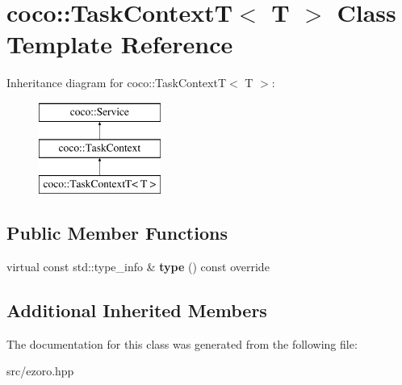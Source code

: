 \hypertarget{classcoco_1_1_task_context_t}{\section{coco\-:\-:Task\-Context\-T$<$ T $>$ Class Template Reference}
\label{classcoco_1_1_task_context_t}
}
Inheritance diagram for coco\-:\-:Task\-Context\-T$<$ T $>$\-:\begin{figure}[H]
\begin{center}
\leavevmode
\includegraphics[height=3.000000cm]{classcoco_1_1_task_context_t}
\end{center}
\end{figure}
\subsection*{Public Member Functions}
\begin{DoxyCompactItemize}
\item 
\hypertarget{classcoco_1_1_task_context_t_a0cd1cf23e0679a4dc147ac8716dafea0}{virtual const std\-::type\-\_\-info \& {\bfseries type} () const override}\label{classcoco_1_1_task_context_t_a0cd1cf23e0679a4dc147ac8716dafea0}

\end{DoxyCompactItemize}
\subsection*{Additional Inherited Members}


The documentation for this class was generated from the following file\-:\begin{DoxyCompactItemize}
\item 
src/ezoro.\-hpp\end{DoxyCompactItemize}
